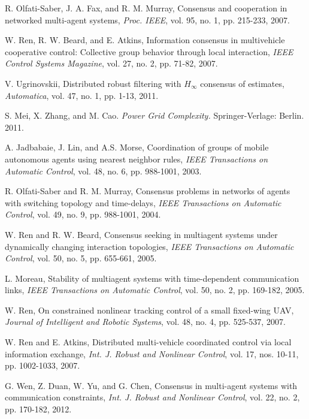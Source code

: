 \documentclass[letterpaper, 10 pt, conference]{ieeeconf}
\begin{document}
\begin{thebibliography}{99}
R. Olfati-Saber, J. A. Fax, and R. M. Murray, Consensus and cooperation
in networked multi-agent systems, \emph{Proc. IEEE}, vol. 95, no. 1, pp. 215-233, 2007.

W. Ren, R. W. Beard, and E. Atkins,
Information consensus in multivehicle cooperative control: Collective group behavior through local interaction,
\emph{IEEE Control Systems Magazine}, vol. 27, no. 2, pp. 71-82, 2007.

V. Ugrinovskii,
Distributed robust filtering with $H_{\infty}$ consensus of
estimates,
\emph{Automatica}, vol. 47, no. 1, pp. 1-13, 2011.

S. Mei, X. Zhang, and M. Cao. \emph{Power Grid Complexity.} Springer-Verlage: Berlin. 2011.

A. Jadbabaie, J. Lin, and A.S. Morse, Coordination of groups
of mobile autonomous agents using nearest neighbor rules,
\emph{IEEE Transactions on Automatic Control}, vol. 48, no. 6,
pp. 988-1001, 2003.

R. Olfati-Saber and R. M. Murray,
Consensus problems in networks of agents with
switching topology and time-delays,
\emph{IEEE Transactions on Automatic Control}, vol. 49, no. 9,
pp. 988-1001, 2004.



W. Ren and R. W. Beard, Consensus seeking in multiagent
systems under dynamically changing interaction topologies,
\emph{IEEE Transactions on Automatic Control}, vol. 50, no. 5,
pp. 655-661, 2005.

L. Moreau,
Stability of multiagent systems with time-dependent communication links,
\emph{IEEE Transactions on Automatic Control}, vol. 50, no. 2,
pp. 169-182, 2005.

W. Ren,
On constrained nonlinear tracking control of a small fixed-wing UAV,
 \emph{Journal of Intelligent and Robotic Systems}, vol. 48, no. 4,  pp. 525-537, 2007.

W. Ren and E. Atkins,
Distributed multi-vehicle coordinated control
via local information exchange,
\emph{Int. J. Robust and Nonlinear Control},
vol. 17, nos. 10-11, pp. 1002-1033, 2007.

G. Wen, Z. Duan, W. Yu, and G. Chen,
Consensus in multi-agent
systems with communication constraints,
\emph{Int. J. Robust and Nonlinear Control}, vol. 22, no. 2, pp. 170-182, 2012.


\end{thebibliography}
\end{document}
